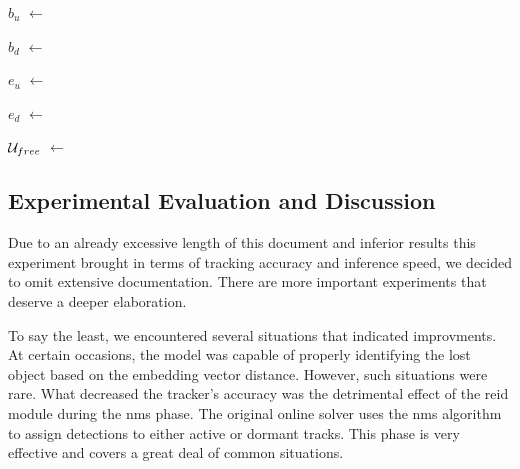 \begin{algorithm}[t]
\begin{algorithmic}[1]
        \State $b_u$ $\gets$ 

        \State $b_d$ $\gets$ 

        \State $e_u$ $\gets$ 

        \State $e_d$ $\gets$ 


        \State {}

        \State {}
        \EndIf

        \EndFor

        \State $\mathcal{U}_{free}$ $\gets$ 

        \State {}

        \State {}

        \EndFunction
    \end{algorithmic}
\end{algorithm}

\subsection{Experimental Evaluation and Discussion}

Due to an already excessive length of this document and inferior results this experiment brought in terms of tracking accuracy and inference speed, we decided to omit extensive documentation. There are more important experiments that deserve a deeper elaboration.

To say the least, we encountered several situations that indicated improvments. At certain occasions, the model was capable of properly identifying the lost object based on the embedding vector distance. However, such situations were rare. What decreased the tracker's accuracy was the detrimental effect of the \gls{reid} module during the \gls{nms} phase. The original online solver uses the \gls{nms} algorithm to assign detections to either active or dormant tracks. This phase is very effective and covers a great deal of common situations.

